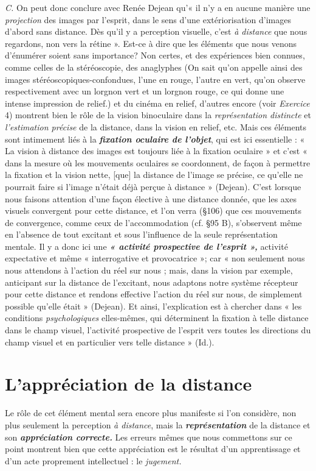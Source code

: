 {\it C.} On peut donc conclure avec Renée Dejean qu’« il n’y a en
aucune manière une {\it projection} des images par l’esprit, dans le sens
d’une extériorisation d’images d’abord sans distance. Dès qu’il y a
perception visuelle, c’est {\it à distance} que nous regardons, non vers la
rétine ». Est-ce à dire que les éléments que nous venons d’énumérer
soient sans importance? Non certes, et des expériences bien connues,
comme celles de la stéréoscopie, des anaglyphes
{\scriptsize (On sait qu'on appelle ainsi des images stéréoscopiques-confondues,
l'une en rouge, l’autre en vert, qu’on observe respectivement avec un lorgnon
vert et un lorgnon rouge, ce qui donne une intense impression de relief.)}
et du cinéma en
relief, d’autres encore (voir {\it Exercice} 4) montrent bien le rôle de la
vision binoculaire dans la {\it représentation distincte} et {\it l’estimation précise}
de la distance, dans la vision en relief, etc. Mais ces éléments sont
intimement liés à la \textbf{\textit {fixation oculaire de l’objet}}, qui est ici essentielle :
« La vision à distance des images est toujours liée à la fixation oculaire »
et c’est « dans la mesure où les mouvements oculaires se coordonnent,
de façon à permettre la fixation et la vision nette, [que]
la distance de l’image se précise, ce qu’elle ne pourrait faire si l’image
n’était déjà perçue à distance » (Dejean). C’est lorsque nous faisons
attention d’une façon élective à une distance donnée, que les axes
visuels convergent pour cette distance, et l’on verra (\S 106) que
ces mouvements de convergence, comme ceux de l’accommodation
(cf. \S 95 B), s’observent même en l’absence de tout excitant et sous
l'influence de la seule représentation mentale. Il y a donc ici une
\textbf{\textit {« activité prospective de l'esprit »,}} activité expectative et même
« interrogative et provocatrice »; car « non seulement nous nous
attendons à l’action du réel sur nous ; mais, dans la vision par exemple,
anticipant sur la distance de l’excitant, nous adaptons notre système
récepteur pour cette distance et rendons effective l’action du réel
sur nous, de simplement possible qu’elle était » (Dejean). Et ainsi,
l'explication est à chercher dans « les conditions {\it psychologiques} elles-mêmes,
qui déterminent la fixation à telle distance dans le champ
visuel, l’activité prospective de l’esprit vers toutes les directions
du champ visuel et en particulier vers telle distance » (Id.).

\section{L’appréciation de la distance}%
Le rôle de cet élément
mental sera encore plus manifeste si l’on considère, non plus seulement
la perception {\it à distance}, mais la \textbf{\textit {représentation}} de la distance
et son \textbf{\textit {appréciation correcte.}} Les erreurs mêmes que nous commettons
sur ce point montrent bien que cette appréciation est le résultat
d’un apprentissage et d’un acte proprement intellectuel : le {\it jugement.}

